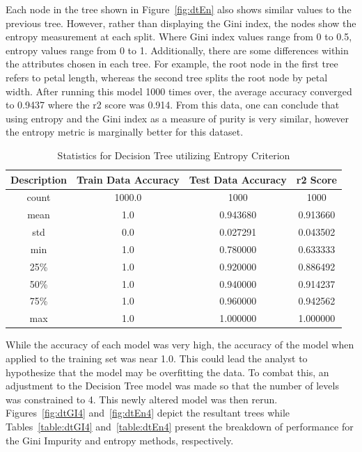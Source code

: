\documentclass[journal]{IEEEtran}
\begin{document}
Each node in the tree shown in Figure~\ref{fig:dtEn} also shows similar values to the previous tree. However, rather than displaying the Gini index, the nodes show the entropy measurement at each split. Where Gini index values range from 0 to 0.5, entropy values range from 0 to 1. Additionally, there are some differences within the attributes chosen in each tree. For example, the root node in the first tree refers to petal length, whereas the second tree splits the root node by petal width. After running this model 1000 times over, the average accuracy converged to 0.9437 where the r2 score was 0.914. From this data, one can conclude that using entropy and the Gini index as a measure of purity is very similar, however the entropy metric is marginally better for this dataset.

\begin{table}[h!]
\centering
\begin{tabular}{ c | c c c }
    Description & Train Data Accuracy & Test Data Accuracy & r2 Score \\ 
\hline
count &              1000.0  &       1000 & 1000\\
mean  &                 1.0  &          0.943680 &    0.913660\\
std   &                 0.0  &          0.027291 &    0.043502\\
min   &                 1.0  &          0.780000 &    0.633333\\
25\%   &                 1.0  &          0.920000 &    0.886492\\
50\%   &                 1.0  &          0.940000 &    0.914237\\
75\%   &                 1.0  &          0.960000 &    0.942562\\
max   &                 1.0  &          1.000000 &    1.000000
\end{tabular}
\caption{Statistics for Decision Tree utilizing Entropy Criterion}
\label{table:dtEn}
\end{table}

While the accuracy of each model was very high, the accuracy of the model when applied to the training set was near 1.0. This could lead the analyst to hypothesize that the model may be overfitting the data. To combat this, an adjustment to the Decision Tree model was made so that the number of levels was constrained to 4. This newly altered model was then rerun. Figures~\ref{fig:dtGI4} and~\ref{fig:dtEn4} depict the resultant trees while Tables~\ref{table:dtGI4} and~\ref{table:dtEn4} present the breakdown of performance for the Gini Impurity and entropy methods, respectively. 
\end{document}
